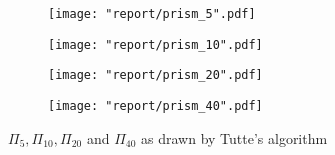 \documentclass[11pt]{report}
\begin{document}
\begin{figure}[H]
    \begin{subfigure}{.5\textwidth}
        \texttt{[image: "report/prism\_5".pdf]}
    \end{subfigure}
    \begin{subfigure}{.5\textwidth}
        \texttt{[image: "report/prism\_10".pdf]}
    \end{subfigure}
    \begin{subfigure}{.5\textwidth}
        \texttt{[image: "report/prism\_20".pdf]}
    \end{subfigure}
    \begin{subfigure}{.5\textwidth}
        \texttt{[image: "report/prism\_40".pdf]}
    \end{subfigure}
    \caption{$\Pi_5, \Pi_{10}, \Pi_{20}$ and $\Pi_{40}$ as drawn by Tutte's algorithm}
\end{figure}
\end{document}
